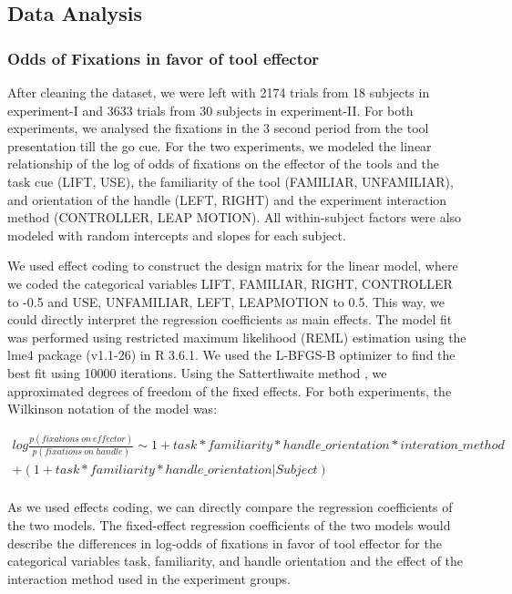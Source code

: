 \subsection{Data Analysis}\label{sec:data_analysis}

\subsubsection{Odds of Fixations in favor of tool effector}

After cleaning the dataset, we were left with 2174 trials from 18 subjects in experiment-I and 3633 trials from 30 subjects in experiment-II. For both experiments, we analysed the fixations in the 3 second period from the tool presentation till the go cue. For the two experiments, we modeled the linear relationship of the log of odds of fixations on the effector of the tools and the task cue (LIFT, USE), the familiarity of the tool (FAMILIAR, UNFAMILIAR), and orientation of the handle (LEFT, RIGHT) and the experiment interaction method (CONTROLLER, LEAP MOTION). All within-subject factors were also modeled with random intercepts and slopes for each subject.

We used effect coding \citep{Schad2018-av} to construct the design matrix for the linear model, where we coded the categorical variables LIFT, FAMILIAR, RIGHT, CONTROLLER to -0.5 and USE, UNFAMILIAR, LEFT, LEAPMOTION to 0.5. This way, we could directly interpret the regression coefficients as main effects. The model fit was performed using restricted maximum likelihood (REML) estimation \citep{Corbeil1976-qq} using the lme4 package (v1.1-26) in R 3.6.1. We used the L-BFGS-B optimizer to find the best fit using 10000 iterations. Using the Satterthwaite method \citep{Luke2017-pz}, we approximated degrees of freedom of the fixed effects. For both experiments, the Wilkinson notation \citep{Wilkinson1973-ex} of the model was:

\begin{gather*}\label{eq:data_model}
    log \frac{p(fixations \: on \: effector)}{p(fixations \: on \: handle)} \sim 1 + task * familiarity * handle\_orientation * interation\_method \\ + (1 + task * familiarity * handle\_orientation | Subject) \\
 \end{gather*}

As we used effects coding, we can directly compare the regression coefficients of the two models. The fixed-effect regression coefficients of the two models would describe the differences in log-odds of fixations in favor of tool effector for the categorical variables task, familiarity, and handle orientation and the effect of the interaction method used in the experiment groups.


